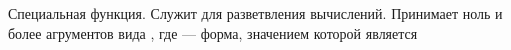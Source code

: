 \documentclass[a4paper, 12pt, titlepage, twoside]{article}
\begin{document}
\subsubsection{}
Специальная функция. Служит для разветвления вычислений. Принимает ноль и более агрументов вида , где  --- форма, значением которой является 
\end{document}
